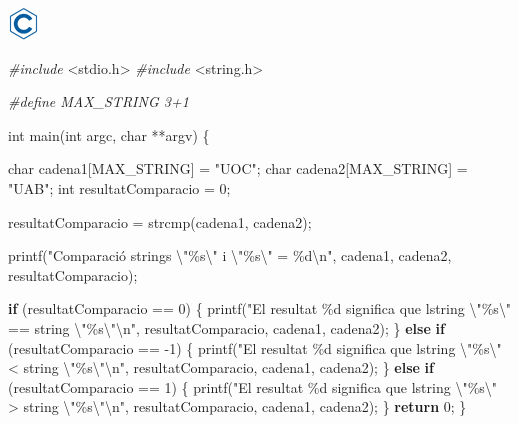 \documentclass[
]{book}
\newenvironment{Shaded}{\begin{snugshade}}{\end{snugshade}}
\newcommand{\ControlFlowTok}[1]{\textcolor[rgb]{0.13,0.29,0.53}{\textbf{#1}}}
\newcommand{\DataTypeTok}[1]{\textcolor[rgb]{0.13,0.29,0.53}{#1}}
\newcommand{\DecValTok}[1]{\textcolor[rgb]{0.00,0.00,0.81}{#1}}
\newcommand{\ImportTok}[1]{#1}
\newcommand{\NormalTok}[1]{#1}
\newcommand{\PreprocessorTok}[1]{\textcolor[rgb]{0.56,0.35,0.01}{\textit{#1}}}
\newcommand{\SpecialCharTok}[1]{\textcolor[rgb]{0.00,0.00,0.00}{#1}}
\newcommand{\StringTok}[1]{\textcolor[rgb]{0.31,0.60,0.02}{#1}}
\begin{document}
\includegraphics{./img/c.png}

\begin{Shaded}
\begin{Highlighting}[]
\PreprocessorTok{\#include }\ImportTok{\textless{}stdio.h\textgreater{}}
\PreprocessorTok{\#include }\ImportTok{\textless{}string.h\textgreater{}}

\PreprocessorTok{\#define MAX\_STRING 3+1}

\DataTypeTok{int}\NormalTok{ main(}\DataTypeTok{int}\NormalTok{ argc, }\DataTypeTok{char}\NormalTok{ **argv) \{}

    \DataTypeTok{char}\NormalTok{ cadena1[MAX\_STRING] = }\StringTok{"UOC"}\NormalTok{;}
    \DataTypeTok{char}\NormalTok{ cadena2[MAX\_STRING] = }\StringTok{"UAB"}\NormalTok{;}
    \DataTypeTok{int}\NormalTok{ resultatComparacio = }\DecValTok{0}\NormalTok{;}
    
\NormalTok{    resultatComparacio = strcmp(cadena1, cadena2);}
    
\NormalTok{      printf(}\StringTok{"Comparació strings }\SpecialCharTok{\textbackslash{}"}\StringTok{\%s}\SpecialCharTok{\textbackslash{}"}\StringTok{ i }\SpecialCharTok{\textbackslash{}"}\StringTok{\%s}\SpecialCharTok{\textbackslash{}"}\StringTok{ = \%d}\SpecialCharTok{\textbackslash{}n}\StringTok{"}\NormalTok{, cadena1, cadena2, resultatComparacio);}
    
      \ControlFlowTok{if}\NormalTok{ (resultatComparacio == }\DecValTok{0}\NormalTok{) \{}
\NormalTok{            printf(}\StringTok{"El resultat \%d significa que l\textquotesingle{}string }\SpecialCharTok{\textbackslash{}"}\StringTok{\%s}\SpecialCharTok{\textbackslash{}"}\StringTok{ == string }\SpecialCharTok{\textbackslash{}"}\StringTok{\%s}\SpecialCharTok{\textbackslash{}"\textbackslash{}n}\StringTok{"}\NormalTok{, resultatComparacio, cadena1, cadena2);}
\NormalTok{    \} }\ControlFlowTok{else} \ControlFlowTok{if}\NormalTok{ (resultatComparacio == {-}}\DecValTok{1}\NormalTok{) \{}
\NormalTok{            printf(}\StringTok{"El resultat \%d significa que l\textquotesingle{}string }\SpecialCharTok{\textbackslash{}"}\StringTok{\%s}\SpecialCharTok{\textbackslash{}"}\StringTok{ \textless{} string }\SpecialCharTok{\textbackslash{}"}\StringTok{\%s}\SpecialCharTok{\textbackslash{}"\textbackslash{}n}\StringTok{"}\NormalTok{, resultatComparacio, cadena1, cadena2);}
\NormalTok{    \} }\ControlFlowTok{else} \ControlFlowTok{if}\NormalTok{ (resultatComparacio == }\DecValTok{1}\NormalTok{) \{}
\NormalTok{            printf(}\StringTok{"El resultat \%d significa que l\textquotesingle{}string }\SpecialCharTok{\textbackslash{}"}\StringTok{\%s}\SpecialCharTok{\textbackslash{}"}\StringTok{ \textgreater{} string }\SpecialCharTok{\textbackslash{}"}\StringTok{\%s}\SpecialCharTok{\textbackslash{}"\textbackslash{}n}\StringTok{"}\NormalTok{, resultatComparacio, cadena1, cadena2);     }
\NormalTok{    \}}
    \ControlFlowTok{return} \DecValTok{0}\NormalTok{;}
\NormalTok{\}}
\end{Highlighting}
\end{Shaded}
\end{document}
